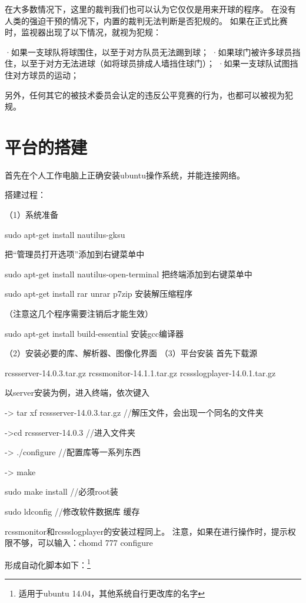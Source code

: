在大多数情况下，这里的裁判我们也可以认为它仅仅是用来开球的程序。
在没有人类的强迫干预的情况下，内置的裁判无法判断是否犯规的。
如果在正式比赛时，监视器出现了以下情况，就视为犯规： 

·如果一支球队将球围住，以至于对方队员无法踢到球； 
·如果球门被许多球员挡住，以至于对方无法进球（如将球员排成人墙挡住球门）；
·如果一支球队试图挡住对方球员的运动； 

另外，任何其它的被技术委员会认定的违反公平竞赛的行为，也都可以被视为犯规。


\section{平台的搭建}
首先在个人工作电脑上正确安装ubuntu操作系统，并能连接网络。

搭建过程：

（1）系统准备

sudo apt-get install nautilus-gksu

把“管理员打开选项”添加到右键菜单中

sudo apt-get install nautilus-open-terminal
把终端添加到右键菜单中

sudo apt-get install rar unrar p7zip
安装解压缩程序

（注意这几个程序需要注销后才能生效）

sudo apt-get install build-essential
安装gcc编译器

（2）安装必要的库、解析器、图像化界面
（3）平台安装
首先下载源

rcssserver-14.0.3.tar.gz  
rcssmonitor-14.1.1.tar.gz   
rcssslogplayer-14.0.1.tar.gz

以server安装为例，进入终端，依次键入

-> tar xf rcssserver-14.0.3.tar.gz   //解压文件，会出现一个同名的文件夹

->cd rcssserver-14.0.3         //进入文件夹

-> ./configure             //配置库等一系列东西

-> make

sudo make install                 //必须root装

sudo ldconfig                    //修改软件数据库 缓存

rcssmonitor和rcssslogplayer的安装过程同上。
注意，如果在进行操作时，提示权限不够，可以输入：chomd 777 configure

形成自动化脚本如下：\footnote{适用于ubuntu 14.04，其他系统自行更改库的名字}

